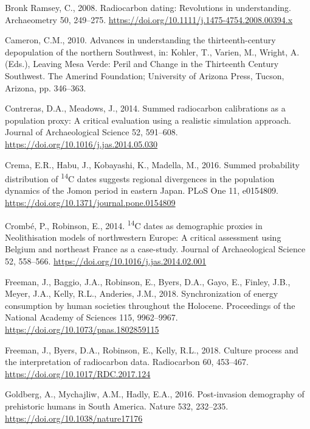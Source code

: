 \documentclass[
]{sa}
\newlength{\cslhangindent}
\newenvironment{cslreferences}%
  {\setlength{\parindent}{0pt}%
  \everypar{\setlength{\hangindent}{\cslhangindent}}\ignorespaces}%
  {\par}
\begin{document}
\begin{cslreferences}
\leavevmode\hypertarget{ref-Bronk2008}{}%
Bronk Ramsey, C., 2008. Radiocarbon dating: Revolutions in understanding. Archaeometry 50, 249--275. \url{https://doi.org/10.1111/j.1475-4754.2008.00394.x}

\leavevmode\hypertarget{ref-Cameron2010}{}%
Cameron, C.M., 2010. Advances in understanding the thirteenth-century depopulation of the northern Southwest, in: Kohler, T., Varien, M., Wright, A. (Eds.), Leaving Mesa Verde: Peril and Change in the Thirteenth Century Southwest. The Amerind Foundation; University of Arizona Press, Tucson, Arizona, pp. 346--363.

\leavevmode\hypertarget{ref-Contreras2014}{}%
Contreras, D.A., Meadows, J., 2014. Summed radiocarbon calibrations as a population proxy: A critical evaluation using a realistic simulation approach. Journal of Archaeological Science 52, 591--608. \url{https://doi.org/10.1016/j.jas.2014.05.030}

\leavevmode\hypertarget{ref-Crema2016}{}%
Crema, E.R., Habu, J., Kobayashi, K., Madella, M., 2016. Summed probability distribution of \textsuperscript{14}C dates suggests regional divergences in the population dynamics of the Jomon period in eastern Japan. PLoS One 11, e0154809. \url{https://doi.org/10.1371/journal.pone.0154809}

\leavevmode\hypertarget{ref-Crombe2014}{}%
Crombé, P., Robinson, E., 2014. \textsuperscript{14}C dates as demographic proxies in Neolithisation models of northwestern Europe: A critical assessment using Belgium and northeast France as a case-study. Journal of Archaeological Science 52, 558--566. \url{https://doi.org/10.1016/j.jas.2014.02.001}

\leavevmode\hypertarget{ref-Freeman2018PNAS}{}%
Freeman, J., Baggio, J.A., Robinson, E., Byers, D.A., Gayo, E., Finley, J.B., Meyer, J.A., Kelly, R.L., Anderies, J.M., 2018. Synchronization of energy consumption by human societies throughout the Holocene. Proceedings of the National Academy of Sciences 115, 9962--9967. \url{https://doi.org/10.1073/pnas.1802859115}

\leavevmode\hypertarget{ref-Freeman2018}{}%
Freeman, J., Byers, D.A., Robinson, E., Kelly, R.L., 2018. Culture process and the interpretation of radiocarbon data. Radiocarbon 60, 453--467. \url{https://doi.org/10.1017/RDC.2017.124}

\leavevmode\hypertarget{ref-Goldberg2016}{}%
Goldberg, A., Mychajliw, A.M., Hadly, E.A., 2016. Post-invasion demography of prehistoric humans in South America. Nature 532, 232--235. \url{https://doi.org/10.1038/nature17176}


\end{cslreferences}
\end{document}
